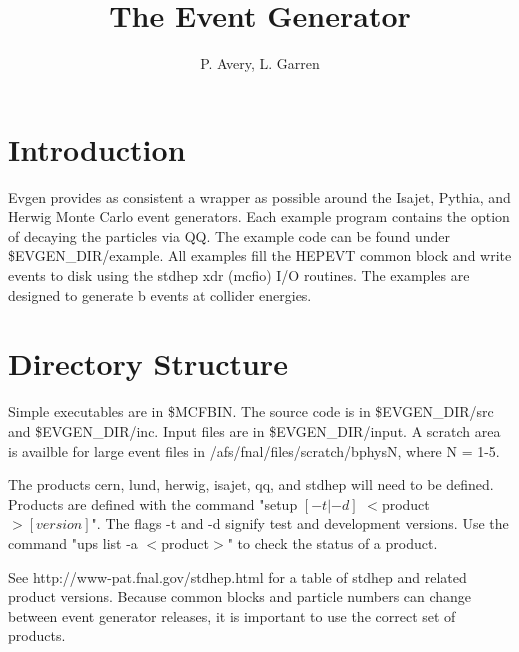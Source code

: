 \textwidth 465pt
\textheight 683.4pt
\oddsidemargin 0pt
\evensidemargin 0pt
\topmargin -2cm
\pagestyle{plain}
\def\dec{\rightarrow}
\def\qsq{$q^2$}



\title{The Event Generator}

\author{P. Avery, L. Garren}

\maketitle
 

\section{Introduction}
 
Evgen provides as consistent a wrapper as possible around the Isajet, 
Pythia, and Herwig Monte Carlo event generators.  Each example program contains
the option of decaying the particles via QQ.  The example code  
can be found under \$EVGEN\_DIR/example.
All examples fill the HEPEVT common block and write events to disk
using the stdhep xdr (mcfio) I/O routines.  The examples are designed
to generate b events at collider energies.

\section{Directory Structure}

Simple executables are in \$MCFBIN.  
The source code is in \$EVGEN\_DIR/src and 
\newline \$EVGEN\_DIR/inc.  
Input files are in \$EVGEN\_DIR/input.  
A scratch area is availble for large event files in 
/afs/fnal/files/scratch/bphysN, where N = 1-5.

The products cern, lund, herwig, isajet, qq, and 
stdhep will need to be defined.  Products are defined with the command 
"setup $[-t|-d]$ $<$product$> [version]$".  
The flags -t and -d signify test and development versions.  
Use the command "ups list -a $<$product$>$" to check the status of a product.

See http://www-pat.fnal.gov/stdhep.html for a table of stdhep and
related product versions.  Because common blocks and particle numbers
can change between event generator releases, it is important to
use the correct set of products.

\vspace{0.2 in}

